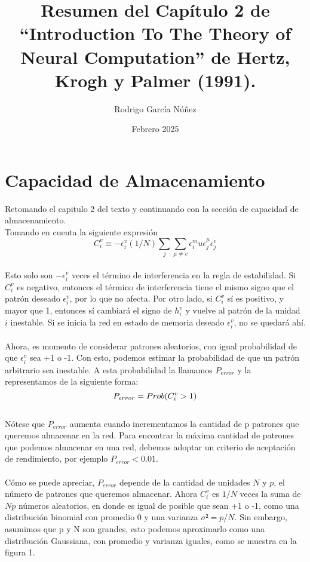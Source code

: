 \documentclass{article}
\title{Resumen del Capítulo 2 de “Introduction To The Theory of Neural Computation” de Hertz, Krogh y Palmer (1991).}
\author{Rodrigo García Núñez}
\affil{Universidad Autónoma Metropolitana }
\date{Febrero 2025}
\begin{document}
\maketitle

\section{Capacidad de Almacenamiento}

Retomando el capitulo 2 del texto y continuando con la sección de capacidad de almacenamiento.
\\
Tomando en cuenta la siguiente expresión
\begin{equation}
    C_i^v \equiv  -\epsilon_i^v (1/N)\sum_j\sum_{\mu\neq v}\epsilon_i^mu\epsilon_j^\mu\epsilon_j^v
    \label{eq:condición de estabilidad}
\end{equation}
\\
Esto solo son $-\epsilon_i^v$ veces el término de interferencia en la regla de estabilidad. Si $C_i^v$ es negativo, entonces el término de interferencia tiene el mismo signo que el patrón deseado $\epsilon_i^v$, por lo que no afecta. Por otro lado, si $C_i^v$ sí es positivo, y mayor que 1, entonces sí cambiará el signo de $h_i^v$ y vuelve al patrón de la unidad $i$ inestable. Si se inicia la red en estado de memoria deseado $\epsilon_i^v$, no se quedará ahí.
\\\\
Ahora, es momento de considerar patrones aleatorios, con igual probabilidad de que $\epsilon_i^v$ sea +1 o -1. Con esto, podemos estimar la probabilidad de que un patrón arbitrario sea inestable. A esta probabilidad la llamamos $P_{error}$ y la representamos de la siguiente forma:
\begin{equation}
    P_{error} =Prob (C_i^v > 1)
    \label{eq:P_{error}}
\end{equation}
\\
Nótese que $P_{error}$ aumenta cuando incrementamos la cantidad de p patrones que queremos almacenar en la red. Para encontrar la máxima cantidad de patrones que podemos almacenar en una red, debemos adoptar un criterio de aceptación de rendimiento, por ejemplo $P_{error} < 0.01$.
\\\\
Cómo se puede apreciar, $P_{error}$ depende de la cantidad de unidades $N$ y $p$, el número de patrones que queremos almacenar. Ahora $C_i^v$ es $1/N$ veces la suma de $Np$ números aleatorios, en donde es igual de posible que sean +1 o -1, como una distribución binomial con promedio 0 y una varianza $\sigma² = p/N$. Sin embargo, asumimos que p y N son grandes, esto podemos aproximarlo como una distribución Gaussiana, con promedio y varianza iguales, como se muestra en la figura 1.
\end{document}
